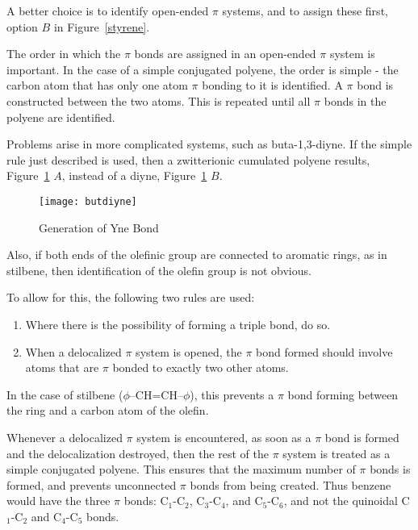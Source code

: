 \begin{description}
A better choice is to identify open-ended $\pi$ systems, and to assign these first,
option $B$ in Figure~\ref{styrene}.  

The order in which the $\pi$ bonds are assigned in an open-ended $\pi$ system is
important.  In the case of a simple conjugated polyene, the order is simple -
the carbon atom that has only one atom $\pi$ bonding to it is identified.
A $\pi$ bond is constructed between the two atoms.  This is repeated until
all $\pi$ bonds in the polyene are identified.

Problems arise in more complicated systems, such as buta-1,3-diyne.  If the
simple rule just described is used, then a zwitterionic cumulated polyene results,
Figure~\ref{butdiyne} $A$,
instead of a diyne, Figure~\ref{butdiyne} $B$.

\begin{figure}
\begin{makeimage}
\end{makeimage}
\begin{center}
\texttt{[image: butdiyne]}
\end{center}
\caption{\label{butdiyne} Generation of Yne Bond}
\end{figure}

Also, if both ends of the olefinic group are connected to aromatic rings, as
in stilbene, then identification of the olefin group is not obvious.

To allow for this, the following two rules are used:
\begin{enumerate}
\item Where there is the possibility of forming a triple bond, do so.
\item When a delocalized $\pi$ system is opened, the $\pi$ bond formed should
involve atoms that are $\pi$ bonded to exactly two other atoms.  
\end{enumerate}
In the case of stilbene ($\phi$--CH=CH--$\phi$), this prevents a $\pi$
bond forming between the ring and a carbon atom of the olefin.

Whenever a delocalized $\pi$ system is encountered, as soon as a $\pi$ bond
is formed and the delocalization destroyed, then the rest of the $\pi$ system
is treated as a simple conjugated polyene.  This ensures that the maximum
number of $\pi$ bonds is formed, and prevents unconnected $\pi$ bonds
from being created.  Thus benzene would have the three $\pi$ bonds:
C$_1$-C$_2$, C$_3$-C$_4$, and C$_5$-C$_6$, and not the quinoidal C$_1$-C$_2$
and C$_4$-C$_5$ bonds.


\end{description}
